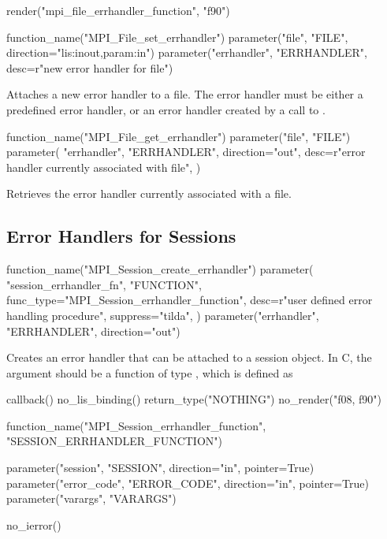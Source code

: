 \begin{mpi-binding}
    render("mpi_file_errhandler_function", "f90")
\end{mpi-binding}

%
%
\begin{mpi-binding}
    function_name("MPI_File_set_errhandler")
    parameter("file", "FILE", direction="lis:inout,param:in")
    parameter("errhandler", "ERRHANDLER", desc=r"new error handler for file")
\end{mpi-binding}

Attaches a new error handler to a file.  The error handler must be
either a predefined error
handler, or an error handler created by a call to
.

%
%
\begin{mpi-binding}
    function_name("MPI_File_get_errhandler")
    parameter("file", "FILE")
    parameter(
        "errhandler",
        "ERRHANDLER",
        direction="out",
        desc=r"error handler currently associated with file",
    )
\end{mpi-binding}

Retrieves the error handler currently associated with a file.

\subsection{Error Handlers for Sessions}
\label{subsec:inquiry-errhdlr-sessions}

%
\begin{mpi-binding}
    function_name("MPI_Session_create_errhandler")
    parameter(
        "session_errhandler_fn",
        "FUNCTION",
        func_type="MPI_Session_errhandler_function",
        desc=r"user defined error handling procedure",
        suppress="tilda",
    )
    parameter("errhandler", "ERRHANDLER", direction="out")
\end{mpi-binding}

Creates an error handler that can be attached to a session object.
In C, the  argument should be a
function of type\flushline
{}, which is defined as

%
\begin{mpi-binding}
    callback()
    no_lis_binding()
    return_type("NOTHING")
    no_render("f08, f90")

    function_name("MPI_Session_errhandler_function", "SESSION_ERRHANDLER_FUNCTION")

    parameter("session", "SESSION", direction="in", pointer=True)
    parameter("error_code", "ERROR_CODE", direction="in", pointer=True)
    parameter("varargs", "VARARGS")

    no_ierror()
\end{mpi-binding}


